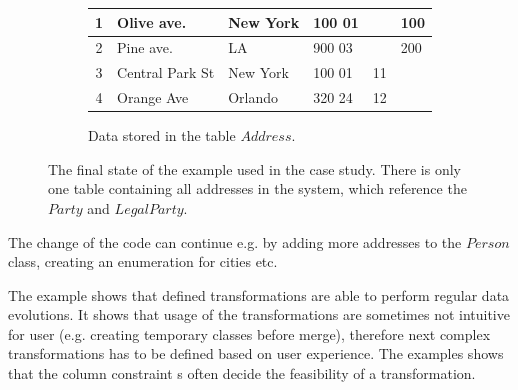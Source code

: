 \documentclass[runningheads]{comsis}
\begin{document}
\begin{figure}
\begin{subfigure}[b]{\textwidth}
\begin{tabular}{| c | l | l | l | l | l |}
		1 & Olive ave. & New York & 100 01 & & 100 \\ \hline
		2 & Pine ave. & LA & 900 03 & & 200  \\ \hline
		3 & Central Park St & New York & 100 01 & 11 &  \\ \hline
		4 & Orange Ave & Orlando & 320 24 & 12 &\\ \hline
	\end{tabular}
	\caption{Data stored in the table $Address$.}
\end{subfigure}
	\caption{The final state of the example used in the case study. There is only one table containing all addresses in the system, which reference the $Party$ and $LegalParty$.}
	\label{fig:case2}
\end{figure}
The change of the code can continue e.g. by adding more addresses to the $Person$ class, creating an enumeration for cities etc.

The example shows that defined transformations are able to perform regular data evolutions. It shows that usage of the transformations are sometimes not intuitive for user (e.g. creating temporary classes before merge), therefore next complex transformations has to be defined based on user experience. The examples shows that the column constraint s often decide the feasibility of a transformation. 
\end{document}
